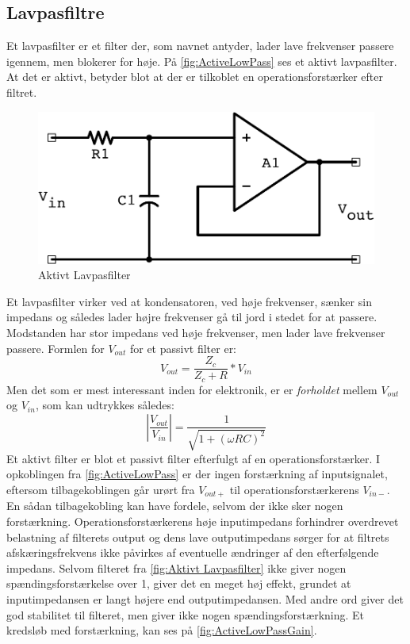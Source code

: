 \subsection{Lavpasfiltre}
\label{Lavpasfiltre}
Et lavpasfilter er et filter der, som navnet antyder, lader lave frekvenser passere igennem, men blokerer for høje. På \autoref{fig:ActiveLowPass} ses et aktivt lavpasfilter. At det er aktivt, betyder blot at der er tilkoblet en operationsforstærker efter filtret.
%
\begin{figure}[H]
	\centering
	\includegraphics[resolution=300,scale=0.5]{Figure/Introduktion/ActiveLowPass.pdf}
	\caption{Aktivt Lavpasfilter}
	\label{fig:ActiveLowPass}
\end{figure}
\noindent
%
Et lavpasfilter virker ved at kondensatoren, ved høje frekvenser, sænker sin impedans og således lader højre frekvenser gå til jord i stedet for at passere. Modstanden har stor impedans ved høje frekvenser, men lader lave frekvenser passere. Formlen for $V_{out}$ for et passivt filter er:
%
\begin{equation} \label{eq:LowPass_Vout}
	V_{out}=\frac{Z_c}{Z_c+R}*V_{in}
\end{equation}
%
Men det som er mest interessant inden for elektronik, er er \textit{forholdet} mellem $V_{out}$ og $V_{in}$, som kan udtrykkes således:
\begin{equation} \label{eq:LowPass_VOutVin}
	 \left\lvert\frac{V_{out}}{V_{in}}\right\rvert=\frac{1}{\sqrt{1+(\omega RC)^2}}
\end{equation}
%
Et aktivt filter er blot et passivt filter efterfulgt af en operationsforstærker. I opkoblingen fra \autoref{fig:ActiveLowPass} er der ingen forstærkning af inputsignalet, eftersom tilbagekoblingen går urørt fra $V_{out+}$ til operationsforstærkerens $V_{in-}$. En sådan tilbagekobling kan have fordele, selvom der ikke sker nogen forstærkning. Operationsforstærkerens høje inputimpedans forhindrer overdrevet belastning af filterets output og dens lave outputimpedans sørger for at filtrets afskæringsfrekvens ikke påvirkes af eventuelle ændringer af den efterfølgende impedans. Selvom filteret fra \autoref{fig:Aktivt Lavpasfilter} ikke giver nogen spændingsforstærkelse over 1, giver det en meget høj effekt, grundet at inputimpedansen er langt højere end outputimpedansen. Med andre ord giver det god stabilitet til filteret, men giver ikke nogen spændingsforstærkning. Et kredsløb med forstærkning, kan ses på \autoref{fig:ActiveLowPassGain}.
